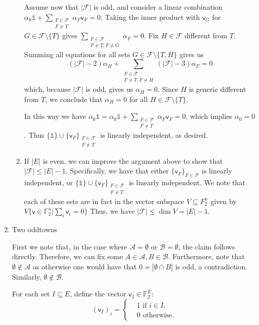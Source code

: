 \documentclass[kulak]{tplt}
\theoremstyle{definition}
\newcommand{\F}{\mathbb{F}}
\newcommand{\FF}{\mathcal F}
\newcommand{\vv}{\mathsf{v}}
\begin{document}
\begin{enumerate}
\begin{enumerate}
Assume now that $|\FF|$ is odd, and consider a linear combination $\alpha_0 \mathbb{1} + \sum_{\substack{F\in \FF \\ F \neq T}} \alpha_F \vv_F = 0$.
Taking the inner product with $\vv_G $ for $G\in \FF\setminus\{T\}$ gives $ \sum_{\substack{F\in \FF \\ F \neq T, F \neq G}} \alpha_F = 0$.
Fix $H \in \FF$ different from $T$.
Summing all equations for all sets $G \in \FF\setminus \{T, H\}$ gives us 
$$(|\FF| - 2) \alpha_H + \sum_{\substack{F\in \FF \\ F \neq T, F \neq H}} (|\FF| - 3) \alpha_F = 0$$
which, because $|\FF|$ is odd, gives us $\alpha_H  = 0$.
Since $H$ is generic different from $T$, we conclude that $\alpha_H = 0 $ for all $H \in \FF\setminus \{T\}$.

In this way we have $\alpha_0 \mathbb{1} = \alpha_0 \mathbb{1} + \sum_{\substack{F\in \FF \\ F \neq T}} \alpha_F \vv_F = 0$, which implies $\alpha_0 = 0$.
Thus $\{\mathbb{1}\} \cup \{\vv_F\}_{\substack{F \in \FF \\ F \neq T}}$ is linearly independent, as desired.

\item 
If $|E|$ is even, we can improve the argument above to show that $|\FF| \leq |E| - 1$.
Specifically, we have that either $\{\vv_F\}_{F \in \FF}$ is linearly independent, or $\{\mathbb{1}\} \cup \{\vv_F\}_{\substack{F \in \FF \\ F \neq T}}$ is linearly independent.
We note that each of these sets are in fact in the vector subspace $V \subseteq F_2^n$ given by $V \{ \vv \in \F_2^n | \sum_i \vv_i = 0\}$
Thus, we have $|\FF| \leq \dim V = |E| - 1$.
\end{enumerate}


\item Two oddtowns

First we note that, in the case where $\mathcal A = \emptyset $ or $\mathcal B = \emptyset$, the claim follows directly.
Therefore, we can fix some $A \in \mathcal A, B \in \mathcal B$.
Furthermore, note that $\emptyset \not\in\mathcal A$ as otherwise one would have that $ 0 = |\emptyset \cap B|$ is odd, a contradiction.
Similarly, $\emptyset \not\in \mathcal B$.

For each set $I \subseteq E$, define the vector $\vv_I \in \F_2^E$:
$$ (\vv_I)_i =\begin{cases*}
      & 1 \text{ if $i \in I$,}\\
      & 0 \text{ otherwise.}
    \end{cases*} $$


\end{enumerate}
\end{document}
